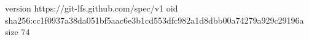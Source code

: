 version https://git-lfs.github.com/spec/v1
oid sha256:cc1f0937a38da051bf5aac6e3b1cd553dfc982a1d8dbb00a74279a929c29196a
size 74
